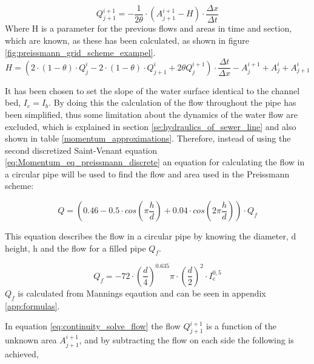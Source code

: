 \begin{equation}\label{eq:continuity_solve_flow}
    Q_{j+1}^{i+1} = - \frac{1}{2\theta}\cdot\left(A_{j+1}^{i+1}-H\right)\cdot\frac{\Delta x}{\Delta t}
\end{equation}
Where H is a parameter for the previous flows and areas in time and section, which are known, as these has been calculated, as shown in figure \ref{fig:preissmann_grid_scheme_exampel}. 
\begin{equation}
    H = \left(2\cdot(1-\theta)\cdot Q_j^i-2\cdot(1-\theta)\cdot Q_{j+1}^i+2\theta Q_j^{i+1}\right)\cdot\frac{\Delta t}{\Delta x}- A_{j}^{i+1}+A_j^i+A_{j+1}^i
\end{equation}

It has been chosen to set the slope of the water surface identical to the channel bed, $I_e = I_b$. By doing this the calculation of the flow throughout the pipe has been simplified, thus some limitation about the dynamics of the water flow are excluded, which is explained in section \ref{se:hydraulics_of_sewer_line} and also shown in table \ref{momentum_approximations}. Therefore, instead of using the second discretized Saint-Venant equation \ref{eq:Momentum_eq_preissmann_discrete} an equation for calculating the flow in a circular pipe will be used \cite{ikke_stationear} to find the flow and area used in the Preissmann scheme:

\begin{equation}\label{eq:calc_for_flowv2}
     Q = \left(0.46-0.5 \cdot cos\left(\pi \frac{h}{d}\right)+0.04\cdot cos\left(2\pi\frac{h}{d}\right)\right)\cdot Q_f
\end{equation}

This equation describes the flow in a circular pipe by knowing the diameter, d height, h and the flow for a filled pipe $Q_f$. %

\begin{equation}\label{eq:qf_for_flow}
    Q_f =-72\cdot \left(\frac{d}{4}\right)^{0.635}\pi\cdot\left(\frac{d}{2}\right)^2\cdot I_e^{0,5}%
\end{equation}
$Q_f$ is calculated from Mannings eqaution and can be seen in appendix \ref{app:formulas}.   

In equation \ref{eq:continuity_solve_flow} the flow $Q_{j+1}^{i+1}$ is a function of the unknown area $A_{j+1}^{i+1}$, and by subtracting the flow on each side the following is achieved,

